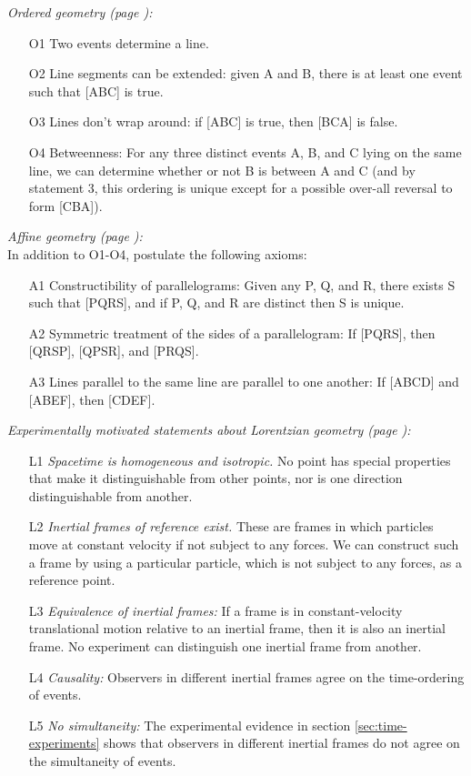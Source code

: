 \documentclass{genrel}
\begin{document}
\emph{Ordered geometry (page \pageref{ordered-geometry-axioms}):}\\\label{ordered-summary}
\begin{itemize}
\item[O1] Two events determine a line.
\item[O2] Line segments can be extended: given A and B, there is at least one event such that [ABC] is true.
\item[O3] Lines don't wrap around: if [ABC] is true, then [BCA] is false.
\item[O4] Betweenness: For any three distinct events A, B, and C lying on the same line, we can determine whether or not B is between A and C (and by statement 3, this ordering is unique except for a possible over-all reversal to form [CBA]).
\end{itemize}

\emph{Affine geometry (page \pageref{affine-axioms}):}\\\label{affine-summary}
In addition to O1-O4, postulate the following axioms:
\begin{itemize}
\item[A1] Constructibility of parallelograms: Given any P, Q, and R, there exists S such that [PQRS], and if P, Q, and R are distinct then S is unique.
\item[A2] Symmetric treatment of the sides of a parallelogram: If [PQRS], then [QRSP], [QPSR], and [PRQS].
\item[A3] Lines parallel to the same line are parallel to one another: If [ABCD] and [ABEF], then [CDEF].
\end{itemize}

\emph{Experimentally motivated statements about Lorentzian geometry (page \pageref{lorentz-geometry-postulates}):}\\\label{lorentz-summary}
\begin{itemize}\label{lorentz-geometry-postulates}
\item[L1] \emph{Spacetime is homogeneous and isotropic.} No point has special properties that make it distinguishable from other points, nor is one
                  direction distinguishable from another.
\item[L2] \emph{Inertial frames of reference exist.} These are frames in which particles move at constant velocity if not subject to any forces.
                  We can construct such a frame by using a particular particle, which is not subject to any forces, as a reference point.
\item[L3] \emph{Equivalence of inertial frames:} If a frame is in constant-velocity translational motion relative to an inertial frame, then it is also an inertial frame.
              No experiment can distinguish one inertial frame from another.
\item[L4] \emph{Causality:} Observers in different inertial frames agree on the time-ordering of events.
\item[L5] \emph{No simultaneity:} The experimental evidence in section \ref{sec:time-experiments} shows that
           observers in different inertial frames do not agree on the simultaneity of events.
\end{itemize}
\end{document}
